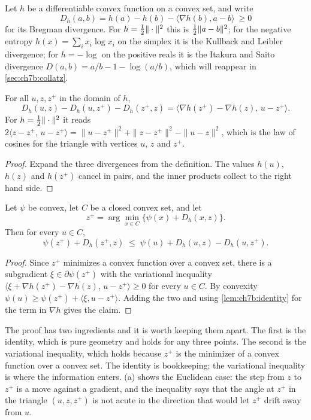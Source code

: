 Let $h$ be a differentiable convex function on a convex set, and write
\[
  D_h(a,b)=h(a)-h(b)-\langle\nabla h(b),a-b\rangle\ \ge0
\]
for its Bregman divergence. For $h=\tfrac{1}{2}\|\cdot\|^2$ this is
$\tfrac{1}{2}\|a-b\|^2$; for the negative entropy $h(x)=\sum_ix_i\log x_i$ on the
simplex it is the Kullback and Leibler divergence; for $h=-\log$ on the
positive reals it is the Itakura and Saito divergence
$D(a,b)=a/b-1-\log(a/b)$, which will reappear in \cref{sec:ch7b:collatz}.

\begin{lemma}\label{lem:ch7b:identity}
For all $u,z,z^+$ in the domain of $h$,
\[
  D_h(u,z)-D_h(u,z^+)-D_h(z^+,z)=\langle\nabla h(z^+)-\nabla h(z),\,u-z^+\rangle.
\]
For $h=\tfrac{1}{2}\|\cdot\|^2$ it reads
$2\langle z-z^+,\,u-z^+\rangle=\|u-z^+\|^2+\|z-z^+\|^2-\|u-z\|^2$, which is
the law of cosines for the triangle with vertices $u$, $z$ and $z^+$.
\end{lemma}

\begin{proof}
Expand the three divergences from the definition. The values $h(u)$, $h(z)$
and $h(z^+)$ cancel in pairs, and the inner products collect to the right
hand side.
\end{proof}

\begin{lemma}\label{lem:ch7b:inequality}
Let $\psi$ be convex, let $C$ be a closed convex set, and let
\[
  z^+=\arg\min_{x\in C}\bigl\{\psi(x)+D_h(x,z)\bigr\}.
\]
Then for every $u\in C$,
\[
  \psi(z^+)+D_h(z^+,z)\;\le\;\psi(u)+D_h(u,z)-D_h(u,z^+).
\]
\end{lemma}

\begin{proof}
Since $z^+$ minimizes a convex function over a convex set, there is a
subgradient $\xi\in\partial\psi(z^+)$ with the variational inequality
$\langle\xi+\nabla h(z^+)-\nabla h(z),\,u-z^+\rangle\ge0$ for every $u\in C$.
By convexity $\psi(u)\ge\psi(z^+)+\langle\xi,u-z^+\rangle$. Adding the two
and using \cref{lem:ch7b:identity} for the term in $\nabla h$ gives the claim.
\end{proof}

The proof has two ingredients and it is worth keeping them apart. The first
is the identity, which is pure geometry and holds for any three points. The
second is the variational inequality, which holds because $z^+$ is the
minimizer of a convex function over a convex set. The identity is
bookkeeping; the variational inequality is where the information enters.
(a) shows the Euclidean case: the step from $z$ to
$z^+$ is a move against a gradient, and the inequality says that the angle at
$z^+$ in the triangle $(u,z,z^+)$ is not acute in the direction that would let
$z^+$ drift away from $u$.

